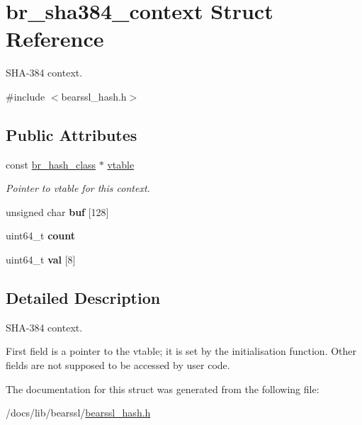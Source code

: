 \hypertarget{structbr__sha384__context}{}\section{br\+\_\+sha384\+\_\+context Struct Reference}
\label{structbr__sha384__context}


S\+H\+A-\/384 context.  




{\ttfamily \#include $<$bearssl\+\_\+hash.\+h$>$}

\subsection*{Public Attributes}
\begin{DoxyCompactItemize}
\item 
\mbox{\label{structbr__sha384__context_adb2aaa29a1399ec390409dc9fc8cad16}} 
const \hyperlink{bearssl__hash_8h_ae38c1b9d539537cc16fc84388b922d86}{br\+\_\+hash\+\_\+class} $\ast$ \hyperlink{structbr__sha384__context_adb2aaa29a1399ec390409dc9fc8cad16}{vtable}
\begin{DoxyCompactList}\small\item\em Pointer to vtable for this context. \end{DoxyCompactList}\item 
\mbox{\label{structbr__sha384__context_a8eb7e108b1669f86e44944725f719f06}} 
unsigned char {\bfseries buf} \mbox{[}128\mbox{]}
\item 
\mbox{\label{structbr__sha384__context_adff7776fbbaa2c22a6c921426963abab}} 
uint64\+\_\+t {\bfseries count}
\item 
\mbox{\label{structbr__sha384__context_a3ba8af8d9f4d742dab386c6980353858}} 
uint64\+\_\+t {\bfseries val} \mbox{[}8\mbox{]}
\end{DoxyCompactItemize}


\subsection{Detailed Description}
S\+H\+A-\/384 context. 

First field is a pointer to the vtable; it is set by the initialisation function. Other fields are not supposed to be accessed by user code. 

The documentation for this struct was generated from the following file\+:\begin{DoxyCompactItemize}
\item 
/docs/lib/bearssl/\hyperlink{bearssl__hash_8h}{bearssl\+\_\+hash.\+h}\end{DoxyCompactItemize}
